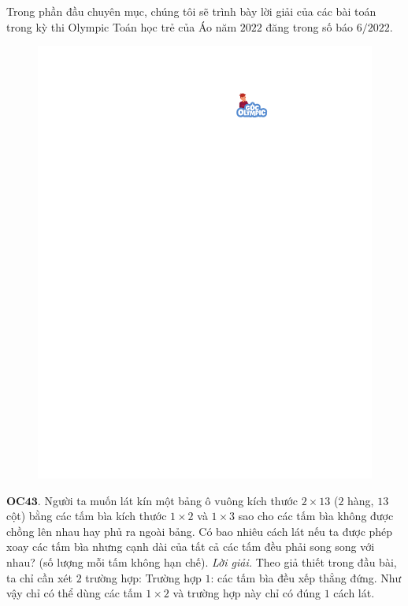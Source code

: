 \begin{multicols}{2}
	Trong phần đầu chuyên mục, chúng tôi sẽ trình bày lời giải của các bài toán trong kỳ thi Olympic Toán học trẻ của Áo năm $2022$ đăng trong số báo $6/2022$. 
	\begin{figure}[H]
		\vspace*{-5pt}
		\centering
		\captionsetup{labelformat= empty, justification=centering}
		\includegraphics[width= 0.85\linewidth]{gocolympic}
		\vspace*{-10pt}
	\end{figure}
	{\bf\color{cackithi} OC$\pmb{43.}$} Người ta muốn lát kín một bảng ô vuông kích thước $2\times 13$ ($2$ hàng, $13$ cột) bằng các tấm bìa kích thước $1\times 2$ và $1\times 3$ sao cho các tấm bìa không được chồng lên nhau hay phủ ra ngoài bảng. Có bao nhiêu cách lát nếu ta được phép xoay các tấm bìa nhưng cạnh dài của tất cả các tấm đều phải song song với nhau? (số lượng mỗi tấm không hạn chế).   
	\vskip 0.1cm
	\textit{Lời giải.} Theo giả thiết trong đầu bài, ta chỉ cần xét $2$ trường hợp:
	\vskip 0.1cm
	Trường hợp $1$: các tấm bìa đều xếp thẳng đứng. Như vậy chỉ có thể dùng các tấm $1\times 2$  và trường hợp này chỉ có đúng $1$ cách lát.
	\vskip 0.1cm

\end{multicols}

